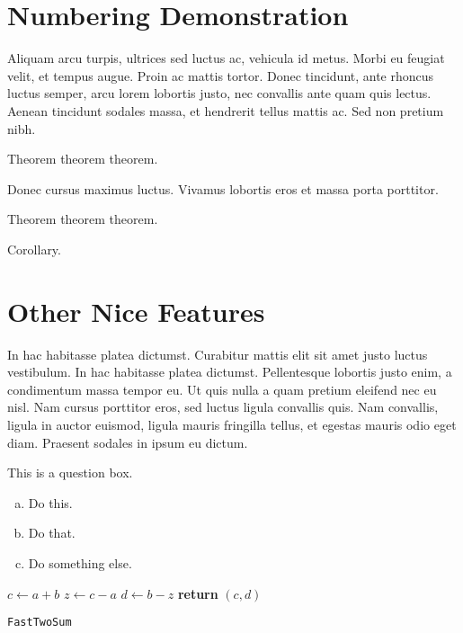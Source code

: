 \documentclass{article}
\begin{document}
\section{Numbering Demonstration}
Aliquam arcu turpis, ultrices sed luctus ac, vehicula id metus. Morbi eu feugiat velit, et tempus augue. Proin ac mattis tortor. Donec tincidunt, ante rhoncus luctus semper, arcu lorem lobortis justo, nec convallis ante quam quis lectus. Aenean tincidunt sodales massa, et hendrerit tellus mattis ac. Sed non pretium nibh.
\begin{theorem}
Theorem theorem theorem.
\end{theorem}
Donec cursus maximus luctus. Vivamus lobortis eros et massa porta porttitor.

\begin{theorem}
Theorem theorem theorem.
\end{theorem}
\begin{cor}
Corollary. 
\end{cor}


\section{Other Nice Features} %

In hac habitasse platea dictumst. Curabitur mattis elit sit amet justo luctus vestibulum. In hac habitasse platea dictumst. Pellentesque lobortis justo enim, a condimentum massa tempor eu. Ut quis nulla a quam pretium eleifend nec eu nisl. Nam cursus porttitor eros, sed luctus ligula convallis quis. Nam convallis, ligula in auctor euismod, ligula mauris fringilla tellus, et egestas mauris odio eget diam. Praesent sodales in ipsum eu dictum.

\begin{question}
	This is a question box.
	\begin{enumerate}[(a)]
		\item Do this.
		\item Do that.
		\item Do something else.
	\end{enumerate}
\end{question}
	
\begin{center}
	\begin{minipage}{0.5\linewidth}
		\begin{algorithm}[H]
			\medskip
			$c \leftarrow a + b$ \;
			$z \leftarrow c - a$ \;
			$d \leftarrow b - z$ \;
			{\bf return} $(c,d)$ \;
			\caption{\texttt{FastTwoSum}} 
			\label{alg:fastTwoSum}  
		\end{algorithm}
	\end{minipage}
\end{center}
\end{document}
